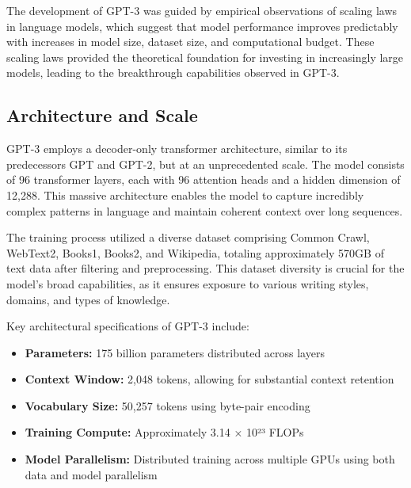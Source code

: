 
The development of GPT-3 was guided by empirical observations of scaling laws in language models, which suggest that model performance improves predictably with increases in model size, dataset size, and computational budget. These scaling laws provided the theoretical foundation for investing in increasingly large models, leading to the breakthrough capabilities observed in GPT-3.

\subsection{Architecture and Scale}

GPT-3 employs a decoder-only transformer architecture, similar to its predecessors GPT and GPT-2, but at an unprecedented scale. The model consists of 96 transformer layers, each with 96 attention heads and a hidden dimension of 12,288. This massive architecture enables the model to capture incredibly complex patterns in language and maintain coherent context over long sequences.


The training process utilized a diverse dataset comprising Common Crawl, WebText2, Books1, Books2, and Wikipedia, totaling approximately 570GB of text data after filtering and preprocessing. This dataset diversity is crucial for the model's broad capabilities, as it ensures exposure to various writing styles, domains, and types of knowledge.

Key architectural specifications of GPT-3 include:
\begin{itemize}
    \item \textbf{Parameters:} 175 billion parameters distributed across layers
    \item \textbf{Context Window:} 2,048 tokens, allowing for substantial context retention
    \item \textbf{Vocabulary Size:} 50,257 tokens using byte-pair encoding
    \item \textbf{Training Compute:} Approximately 3.14 × 10²³ FLOPs
    \item \textbf{Model Parallelism:} Distributed training across multiple GPUs using both data and model parallelism
\end{itemize}


